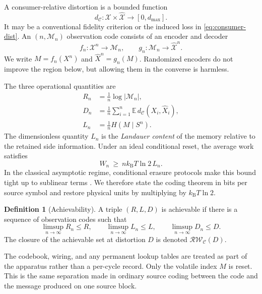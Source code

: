 \documentclass[letterpaper,onecolumn]{IEEEtran}
\theoremstyle{definition}
\newtheorem{definition}{Definition}
\theoremstyle{remark}
\newcommand{\E}{\mathbb{E}}
\newcommand{\cC}{\mathcal{C}}
\newcommand{\cX}{\mathcal{X}}
\newcommand{\hX}{\widehat{X}}
\newcommand{\hXn}{\widehat{X}^{n}}
\newcommand{\RW}{\mathcal{R}\!\mathcal{W}}
\newcommand{\1}{\mathbf{1}}
\newcommand{\kb}{k_{\mathrm B}}
\begin{document}
A consumer-relative distortion is a bounded function
\begin{equation}
 d_{\cC}:\cX\times\widehat{\cX}\longrightarrow[0,d_{\max}].
\end{equation}
It may be a conventional fidelity criterion or the induced loss in
\eqref{eq:consumer-dist}. An $(n,\mathcal M_n)$ observation code consists of an
encoder and decoder
\begin{equation}
 f_n:\cX^n\to\mathcal M_n,
 \qquad
 g_n:\mathcal M_n\to\widehat{\cX}^{n}.
\end{equation}
We write $M=f_n(X^n)$ and $\hXn=g_n(M)$. Randomized encoders do not improve the
region below, but allowing them in the converse is harmless.

The three operational quantities are
\begin{align}
 R_n&=\frac{1}{n}\log |\mathcal M_n|,\label{eq:rate-def}\\
 D_n&=\frac{1}{n}\sum_{i=1}^{n}\E\,d_{\cC}(X_i,\hX_i),\label{eq:dist-def}\\
 L_n&=\frac{1}{n}H(M\mid S^n).\label{eq:work-def}
\end{align}
The dimensionless quantity $L_n$ is the \emph{Landauer content} of the memory
relative to the retained side information. Under an ideal conditional reset,
the average work satisfies
\begin{equation}
 W_n\ \ge\ n\kb T\ln2\,L_n.
 \label{eq:landauer-bound}
\end{equation}
In the classical asymptotic regime, conditional erasure protocols make this
bound tight up to sublinear terms \cite{delrio2011,faist2015}. We therefore
state the coding theorem in bits per source symbol and restore physical units by
multiplying by $\kb T\ln2$.

\begin{definition}[Achievability]
A triple $(R,L,D)$ is achievable if there is a sequence of observation codes
such that
\begin{equation}
 \limsup_{n\to\infty}R_n\le R,\qquad
 \limsup_{n\to\infty}L_n\le L,\qquad
 \limsup_{n\to\infty}D_n\le D.
\end{equation}
The closure of the achievable set at distortion $D$ is denoted
$\RW_{\cC}(D)$.
\end{definition}

The codebook, wiring, and any permanent lookup tables are treated as part of the
apparatus rather than a per-cycle record. Only the volatile index $M$ is reset.
This is the same separation made in ordinary source coding between the code and
the message produced on one source block.
\end{document}
